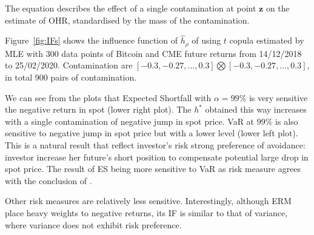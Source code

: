 
The equation describes the effect of a single contamination at point $\bm{z}$ on the estimate of OHR,
standardised by the mass of the contamination. \medskip

Figure~\ref{fig:IFs} shows the influence function of $\hat h_\rho$ of using $t$ copula estimated by MLE with 300 data points of
Bitcoin and CME future returns from 14/12/2018 to 25/02/2020.
Contamination are $[-0.3,-0.27,..., 0.3] \bigotimes [-0.3,-0.27,..., 0.3]$, in total $900$ pairs of contamination. \medskip

We can see from the plots that Expected Shortfall with $\alpha = 99\%$ is very sensitive the negative return in spot (lower right plot).
The $h^*$ obtained this way increases with a single contamination of negative jump in spot price.
VaR at $99\%$ is also sensitive to negative jump in spot price but with a lower level (lower left plot).
This is a natural result that reflect investor's risk strong preference of avoidance: investor increase her future's short position
to compensate potential large drop in spot price.
The result of ES being more sensitive to VaR as risk measure agrees with the conclusion of \citet{cont2010robustness}. \medskip

Other risk measures are relatively less sensitive.
Interestingly, although ERM place heavy weights to negative returns,
its IF is similar to that of variance, where variance does not exhibit risk preference.


